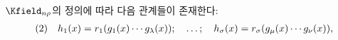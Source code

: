 
$\Kfield_{n\rho}$의 정의에 따라 다음 관계들이 존재한다:
\[
\begin{array}{@{}l@{\quad}c@{}}
(2)&h_1(x)=r_1(g_1(x)\cdots g_\lambda(x));\quad\ldots;\quad h_\sigma(x)=r_\sigma(g_\mu(x)\cdots g_\nu(x)),
\end{array}
\]
